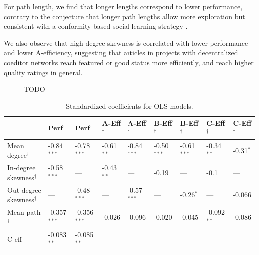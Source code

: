 \documentclass[10pt,twocolumn]{article}
\newcommand{\+}{\phantom{-}}
\begin{document}
For path length, we find that longer lengths correspond to lower performance, contrary to the conjecture
that longer path lengths allow more exploration \cite{mason_propagation_2008}
but consistent with a conformity-based social learning strategy \cite{barkoczi_social_2016}.

We also observe that high degree skewness is correlated with lower performance and lower A-efficiency,
suggesting that articles in projects with decentralized coeditor networks reach featured or good status
more efficiently, and reach higher quality ratings in general.

\begin{figure}
\caption{
TODO
\label{fig:degree-mincut}
}
\end{figure}

\begin{table}
\small
\caption{Standardized coefficients for OLS models.
\label{tab:model}
}
\bigskip
\begin{tabular}{lllllllll}
\hline
                               & Perf$^\dagger$ & Perf$^\dagger$ & A-Eff$^\dagger$ & A-Eff$^\dagger$ & B-Eff$^\dagger$ & B-Eff$^\dagger$ & C-Eff$^\dagger$ & C-Eff$^\dagger$ \\
\hline
Mean degree$^\dagger$          &  -0.84$^{***}$  &  -0.78$^{***}$
                               &  -0.61$^{**}$   &  -0.84$^{***}$
                               &  -0.50$^{***}$  &  -0.61$^{***}$
                               &  -0.34$^{**}$   &  -0.31$^{*}$ \\
In-degree skewness$^\dagger$   &  -0.58$^{***}$  & \+ ---      
                               &  -0.43$^{**}$   & \+ ---      
                               &  -0.19          & \+ ---      
                               &  -0.1           & \+ ---      \\
Out-degree skewness$^\dagger$  &  \+ ---         &  -0.48$^{***}$  
                               &  \+ ---         &  -0.57$^{***}$
                               &  \+ ---         &  -0.26$^{*}$
                               &  \+ ---         &  -0.066 \\
Mean path$^\dagger$            &  -0.357$^{***}$ &  -0.356$^{***}$ 
                               &  -0.026         &  -0.096
                               &  -0.020         &  -0.045
                               &  -0.092$^{**}$  &  -0.086 \\
C-eff$^\dagger$                &  -0.083$^{**}$  & -0.085$^{**}$  
                               &  \+ ---         & \+ ---      
                               &  \+ ---         & \+ ---      

\end{tabular}
\end{table}
\end{document}
